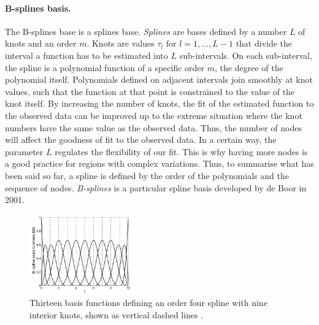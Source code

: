 \paragraph{B-splines basis.} The B-splines base is a splines base. \emph{Splines} are bases defined by a number $L$ of knots and an order $m$. Knots are values $\tau_l$ for $l=1,\dots, L-1$ that divide the interval a function has to be estimated into $L$ sub-intervals. On each sub-interval, the spline is a polynomial function of a specific order $m$, the degree of the polynomial itself. Polynomials defined on adjacent intervals join smoothly at knot values, such that the function at that point is constrained to the value of the knot itself. By increasing the number of knots, the fit of the estimated function to the observed data can be improved up to the extreme situation where the knot numbers have the same value as the observed data. Thus, the number of nodes will affect the goodness of fit to the observed data. In a certain way, the parameter $L$ regulates the flexibility of our fit. This is why having more nodes is a good practice for regions with complex variations. Thus, to summarise what has been said so far, a spline is defined by the order of the polynomials and the sequence of nodes. \emph{B-splines} is a particular spline basis developed by de Boor in 2001. 
\begin{figure}
\centering
\includegraphics[width=0.4\textwidth]{Images/bspline.png}
\caption[Bsplines basis.]{Thirteen basis functions defining an order four spline with nine interior knots, shown as vertical dashed lines \cite{ramsay_functional_2006}.}
\label{fig:bspline_13}
\end{figure}
